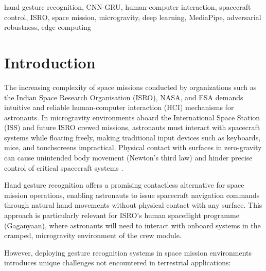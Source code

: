 \documentclass[conference]{IEEEtran}
\begin{document}
\begin{IEEEkeywords}
hand gesture recognition, CNN-GRU, human-computer interaction, spacecraft control, ISRO, space mission, microgravity, deep learning, MediaPipe, adversarial robustness, edge computing
\end{IEEEkeywords}

\section{Introduction}

The increasing complexity of space missions conducted by organizations such as the Indian Space Research Organisation (ISRO), NASA, and ESA demands intuitive and reliable human-computer interaction (HCI) mechanisms for astronauts. In microgravity environments aboard the International Space Station (ISS) and future ISRO crewed missions, astronauts must interact with spacecraft systems while floating freely, making traditional input devices such as keyboards, mice, and touchscreens impractical. Physical contact with surfaces in zero-gravity can cause unintended body movement (Newton's third law) and hinder precise control of critical spacecraft systems \cite{ref_chinese_paper}.

Hand gesture recognition offers a promising contactless alternative for space mission operations, enabling astronauts to issue spacecraft navigation commands through natural hand movements without physical contact with any surface. This approach is particularly relevant for ISRO's human spaceflight programme (Gaganyaan), where astronauts will need to interact with onboard systems in the cramped, microgravity environment of the crew module.

However, deploying gesture recognition systems in space mission environments introduces unique challenges not encountered in terrestrial applications:
\end{document}
